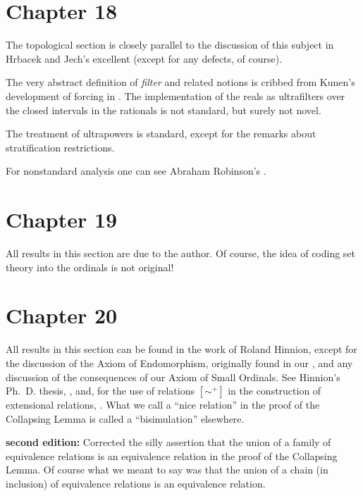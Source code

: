 \section*{Chapter 18}

The topological section is closely parallel to the discussion of this
subject in Hrbacek and Jech's excellent \cite{hrbacek} (except for any
defects, of course).

The very abstract definition of {\itshape filter\/} and related notions is
cribbed from Kunen's development of forcing in \cite{kunen}.  The
implementation of the reals as
ultrafilters over the closed intervals 
in the rationals is not standard, but surely not novel.

The treatment of ultrapowers is standard, except for the remarks about
stratification restrictions.

For nonstandard analysis one can see Abraham Robinson's \cite{nonstandard}.



\section*{Chapter 19}

All results in this section are due to the author.  Of course, the
idea of coding set theory into the ordinals is not
original! 



\section*{Chapter 20}

All results in this section can be found in the work of Roland
Hinnion, except for the discussion of the Axiom of Endomorphism,
originally found in our \cite{afa}, and any discussion of the
consequences of our Axiom of Small Ordinals.  See Hinnion's Ph.~D. thesis, \cite{hinnion}, and, for the
use of relations $[\sim^+]$ in the construction of extensional
relations, \cite{hinnion2}.  What we call a ``nice relation'' in the
proof of the Collapsing Lemma is called a ``bisimulation'' elsewhere.

{\bf second edition:}  Corrected the silly assertion that the union of a family of equivalence relations is an equivalence relation in
the proof of the Collapsing Lemma.  Of course what we meant to say was that the union of a chain (in inclusion) of equivalence relations is an equivalence relation.

